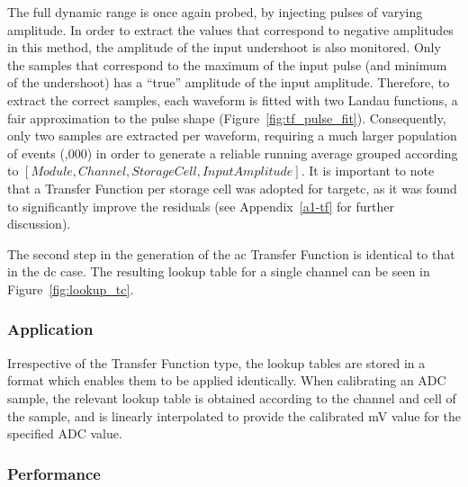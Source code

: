 The full dynamic range is once again probed, by injecting pulses of varying amplitude. In order to extract the values that correspond to negative amplitudes in this method, the amplitude of the input undershoot is also monitored. Only the samples that correspond to the maximum of the input pulse (and minimum of the undershoot) has a ``true'' amplitude of the input amplitude. Therefore, to extract the correct samples, each waveform is fitted with two Landau functions, a fair approximation to the pulse shape (Figure~\ref{fig:tf_pulse_fit}). Consequently, only two samples are extracted per waveform, requiring a much larger population of events (,000) in order to generate a reliable running average grouped according to $[Module, Channel, Storage Cell, Input Amplitude]$. It is important to note that a Transfer Function per storage cell was adopted for \gls{targetc}, as it was found to significantly improve the residuals (see Appendix~\ref{a1-tf} for further discussion).

The second step in the generation of the \gls{ac} Transfer Function is identical to that in the \gls{dc} case. The resulting lookup table for a single channel can be seen in Figure~\ref{fig:lookup_tc}.

\subsubsection{Application}

Irrespective of the Transfer Function type, the lookup tables are stored in a format which enables them to be applied identically. When calibrating an ADC sample, the relevant lookup table is obtained according to the channel and cell of the sample, and is linearly interpolated to provide the calibrated \si{mV} value for the specified ADC value.

\subsubsection{Performance}

